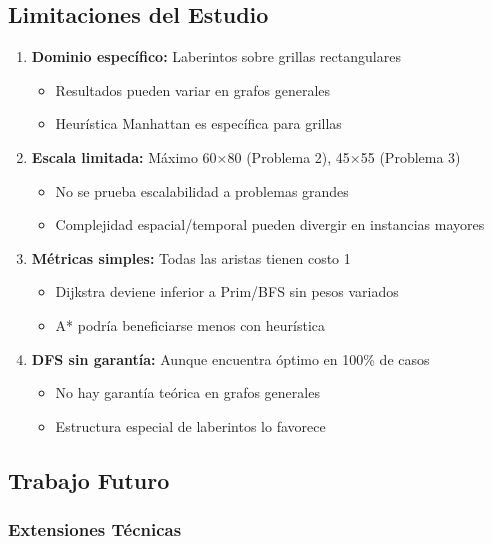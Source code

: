 \documentclass[12pt,a4paper]{article}
\begin{document}
\subsection{Limitaciones del Estudio}

\begin{enumerate}
    \item \textbf{Dominio específico:} Laberintos sobre grillas rectangulares
    \begin{itemize}
        \item Resultados pueden variar en grafos generales
        \item Heurística Manhattan es específica para grillas
    \end{itemize}
    
    \item \textbf{Escala limitada:} Máximo 60×80 (Problema 2), 45×55 (Problema 3)
    \begin{itemize}
        \item No se prueba escalabilidad a problemas grandes
        \item Complejidad espacial/temporal pueden divergir en instancias mayores
    \end{itemize}
    
    \item \textbf{Métricas simples:} Todas las aristas tienen costo 1
    \begin{itemize}
        \item Dijkstra deviene inferior a Prim/BFS sin pesos variados
        \item A* podría beneficiarse menos con heurística
    \end{itemize}
    
    \item \textbf{DFS sin garantía:} Aunque encuentra óptimo en 100\% de casos
    \begin{itemize}
        \item No hay garantía teórica en grafos generales
        \item Estructura especial de laberintos lo favorece
    \end{itemize}
\end{enumerate}

\subsection{Trabajo Futuro}

\subsubsection{Extensiones Técnicas}
\end{document}
